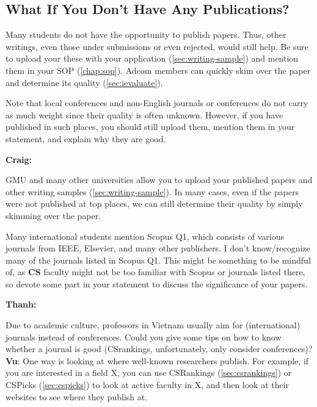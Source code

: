 \documentclass[oneside,11pt]{book}
\newenvironment{commentbox}[1][]{
  \small
  \begin{marker}[\faChessPawn{}]
    {\textbf{#1}}
  }{
  \end{marker}
}
\newenvironment{questionbox}[1][]{
  \small
  \begin{marker}[\faChessRook{}]
    {\textbf{#1}}
  }{
  \end{marker}
}
\begin{document}
\subsection{What If You Don't Have Any Publications?} 

Many students do not have the opportunity to publish papers. Thus, other writings, even those under submissions or even rejected, would still help. 
Be sure to upload your these with your application (\autoref{sec:writing-sample}) and mention them in your SOP (\autoref{chap:sop}). Adcom members can quickly skim over the paper and determine its quality (\autoref{sec:ievaluate}).

Note that local conferences and non-English journals or conferences do
not carry as much weight since their quality is often unknown. However, if you have published in such places, you should still upload them, mention them in your statement, and explain why they are good.

\begin{commentbox}[Craig:]
    GMU and many other universities allow you to upload your published papers and other writing samples (\autoref{sec:writing-sample}). In many cases, even if the papers were not published at top places, we can still determine their quality by simply skimming over the paper.
  \end{commentbox}
  



\begin{commentbox}
    Many international students mention Scopus \acrshort{Q1}, which consists of various journals from IEEE, Elsevier, and many other publishers.  I don't know/recognize many of the journals listed in Scopus Q1. This might be something to be mindful of, as \textbf{CS} faculty might not be too familiar with Scopus or journals listed there, so devote some part in your statement to discuss the significance of your papers.
  \end{commentbox}
  
  \begin{questionbox}[Thanh:]
      Due to academic culture, professors in Vietnam usually aim for (international) journals instead of conferences. Could you give some tips on how to know whether a journal is good (CSrankings, unfortunately, only consider conferences)?
      \tcblower
      \textbf{Vu}: One way is looking at where well-known researchers publish. For example, if you are interested in a field X, you can use CSRankings (\autoref{sec:csrankings}) or CSPicks (\autoref{sec:cspicks}) to look at active faculty in X, and then look at their websites to see where they publish at.
  \end{questionbox}
\end{document}
